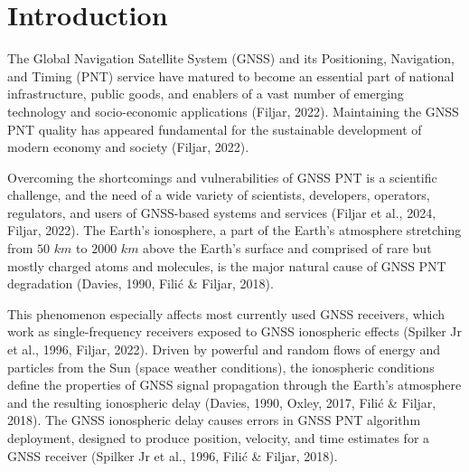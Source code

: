 \documentclass[sn-mathphys-num]{sn-jnl}%
\begin{document}



\maketitle

\section{Introduction}

The Global Navigation Satellite System (GNSS) and its Positioning, Navigation, and Timing (PNT) service have matured to become an essential part of national infrastructure, public goods, and enablers of a vast number of emerging technology and socio-economic applications (Filjar, 2022). Maintaining the GNSS PNT quality has appeared fundamental for the sustainable development of modern economy and society (Filjar, 2022). 

Overcoming the shortcomings and vulnerabilities of GNSS PNT is a scientific challenge, and the need of a wide variety of scientists, developers, operators, regulators, and users of GNSS-based systems and services (Filjar et al., 2024, Filjar, 2022). The Earth’s ionosphere, a part of the Earth’s atmosphere stretching from $50$ $km$ to $2000$ $km$ above the Earth’s surface and comprised of rare but mostly charged atoms and molecules, is the major natural cause of GNSS PNT degradation (Davies, 1990, Filić & Filjar, 2018). 

This phenomenon especially affects most currently used GNSS receivers, which work as single-frequency receivers exposed to GNSS ionospheric effects (Spilker Jr et al., 1996, Filjar, 2022). Driven by powerful and random flows of energy and particles from the Sun (space weather conditions), the ionospheric conditions define the properties of GNSS signal propagation through the Earth’s atmosphere and the resulting ionospheric delay (Davies, 1990, Oxley, 2017, Filić & Filjar, 2018). The GNSS ionospheric delay causes errors in GNSS PNT algorithm deployment, designed to produce position, velocity, and time estimates for a GNSS receiver (Spilker Jr et al., 1996, Filić & Filjar, 2018). 
\end{document}

